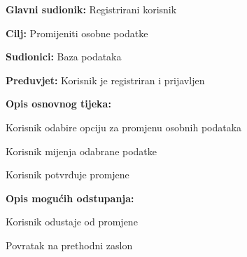 					\noindent {}
					\begin{packed_item}
						
						\item \textbf{Glavni sudionik: } Registrirani korisnik
						\item  \textbf{Cilj:} Promijeniti osobne podatke
						\item  \textbf{Sudionici:} Baza podataka
						\item  \textbf{Preduvjet:} Korisnik je registriran i prijavljen
						\item  \textbf{Opis osnovnog tijeka:}
						
						\item[] \begin{packed_enum}
							
							\item Korisnik odabire opciju za promjenu osobnih podataka
							\item Korisnik mijenja odabrane podatke
							\item Korisnik potvrđuje promjene
						\end{packed_enum}
						
						\item  \textbf{Opis mogućih odstupanja:}
						
						\item[] \begin{packed_item}
							
							\item[3.a] Korisnik odustaje od promjene
							\item[] \begin{packed_enum}
								
								\item Povratak na prethodni zaslon
								
							\end{packed_enum}
							
						\end{packed_item}
						
					\end{packed_item}
					
